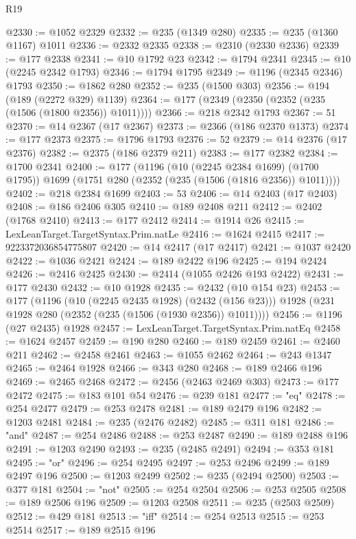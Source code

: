 \begin{lexlean}{R19}
\begin{coremodule}
@2330 := @1052 @2329
@2332 := @235 (@1349 @280)
@2335 := @235 (@1360 @1167) @1011
@2336 := @2332 @2335
@2338 := @2310 (@2330 @2336)
@2339 := @177 @2338
@2341 := @10 @1792 @23
@2342 := @1794 @2341
@2345 := @10 (@2245 @2342 @1793)
@2346 := @1794 @1795
@2349 := @1196 (@2345 @2346) @1793
@2350 := @1862 @280
@2352 := @235 (@1500 @303)
@2356 := @194 (@189 (@2272 @329) @1139)
@2364 := @177 (@2349 (@2350 (@2352 (@235 (@1506 (@1800 @2356)) @1011))))
@2366 := @218 @2342 @1793
@2367 := 51
@2370 := @14 @2367 (@17 @2367)
@2373 := @2366 (@186 @2370 @1373)
@2374 := @177 @2373
@2375 := @1796 @1793
@2376 := 52
@2379 := @14 @2376 (@17 @2376)
@2382 := @2375 (@186 @2379 @211)
@2383 := @177 @2382
@2384 := @1700 @2341
@2400 := @177
    (@1196
      (@10 (@2245 @2384 @1699) (@1700 @1795))
      @1699
      (@1751 @280 (@2352 (@235 (@1506 (@1816 @2356)) @1011))))
@2402 := @218 @2384 @1699
@2403 := 53
@2406 := @14 @2403 (@17 @2403)
@2408 := @186 @2406 @305
@2410 := @189 @2408 @211
@2412 := @2402 (@1768 @2410)
@2413 := @177 @2412
@2414 := @1914 @26
@2415 := LexLeanTarget.TargetSyntax.Prim.natLe
@2416 := @1624 @2415
@2417 := 9223372036854775807
@2420 := @14 @2417 (@17 @2417)
@2421 := @1037 @2420
@2422 := @1036 @2421
@2424 := @189 @2422 @196
@2425 := @194 @2424
@2426 := @2416 @2425
@2430 := @2414 (@1055 @2426 @193 @2422)
@2431 := @177 @2430
@2432 := @10 @1928
@2435 := @2432 (@10 @154 @23)
@2453 := @177
    (@1196
      (@10 (@2245 @2435 @1928) (@2432 (@156 @23)))
      @1928
      (@231 @1928 @280 (@2352 (@235 (@1506 (@1930 @2356)) @1011))))
@2456 := @1196 (@27 @2435) @1928
@2457 := LexLeanTarget.TargetSyntax.Prim.natEq
@2458 := @1624 @2457
@2459 := @190 @280
@2460 := @189 @2459
@2461 := @2460 @211
@2462 := @2458 @2461
@2463 := @1055 @2462
@2464 := @243 @1347
@2465 := @2464 @1928
@2466 := @343 @280
@2468 := @189 @2466 @196
@2469 := @2465 @2468
@2472 := @2456 (@2463 @2469 @303)
@2473 := @177 @2472
@2475 := @183 @101 @54
@2476 := @239 @181
@2477 := "eq"
@2478 := @254 @2477
@2479 := @253 @2478
@2481 := @189 @2479 @196
@2482 := @1203 @2481
@2484 := @235 (@2476 @2482)
@2485 := @311 @181
@2486 := "and"
@2487 := @254 @2486
@2488 := @253 @2487
@2490 := @189 @2488 @196
@2491 := @1203 @2490
@2493 := @235 (@2485 @2491)
@2494 := @353 @181
@2495 := "or"
@2496 := @254 @2495
@2497 := @253 @2496
@2499 := @189 @2497 @196
@2500 := @1203 @2499
@2502 := @235 (@2494 @2500)
@2503 := @377 @181
@2504 := "not"
@2505 := @254 @2504
@2506 := @253 @2505
@2508 := @189 @2506 @196
@2509 := @1203 @2508
@2511 := @235 (@2503 @2509)
@2512 := @429 @181
@2513 := "iff"
@2514 := @254 @2513
@2515 := @253 @2514
@2517 := @189 @2515 @196

\end{coremodule}
\end{lexlean}
